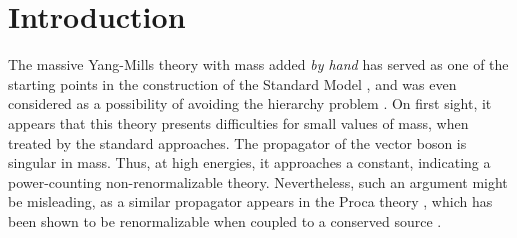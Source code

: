 \documentclass{article}
\begin{document}
\section{Introduction}
The massive Yang-Mills theory with mass added \textit{by hand} has served as one of the starting points in the construction of the Standard Model \cite{Glashow}, and was even considered as a possibility of avoiding the hierarchy problem \cite{Delburgo}. On first sight, it appears that this theory presents difficulties for small values of mass, when treated by the standard approaches. The propagator of the vector boson is singular in mass. Thus, at high energies, it approaches a constant, indicating a power-counting non-renormalizable theory. 
Nevertheless, such an argument might be misleading, as a similar propagator appears in the Proca theory \cite{Proca}, which has been shown to be renormalizable when coupled to a conserved source \cite{BoulGil}.
\end{document}
